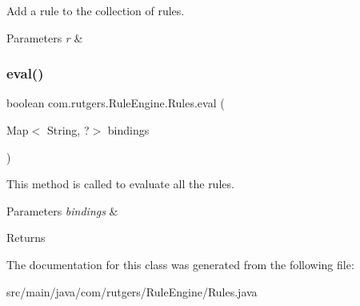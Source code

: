 Add a rule to the collection of rules. 
\begin{DoxyParams}{Parameters}
{\em r} & \\
\hline
\end{DoxyParams}
\mbox{\label{classcom_1_1rutgers_1_1RuleEngine_1_1Rules_a4a0df8e66e124b6b6134a144dc6cb656}} 
\subsubsection{\texorpdfstring{eval()}{eval()}}
{\footnotesize\ttfamily boolean com.\+rutgers.\+Rule\+Engine.\+Rules.\+eval (\begin{DoxyParamCaption}\item[{Map$<$ String, ?$>$}]{bindings }\end{DoxyParamCaption})}

This method is called to evaluate all the rules. 
\begin{DoxyParams}{Parameters}
{\em bindings} & \\
\hline
\end{DoxyParams}
\begin{DoxyReturn}{Returns}

\end{DoxyReturn}


The documentation for this class was generated from the following file\+:\begin{DoxyCompactItemize}
\item 
src/main/java/com/rutgers/\+Rule\+Engine/Rules.\+java\end{DoxyCompactItemize}

